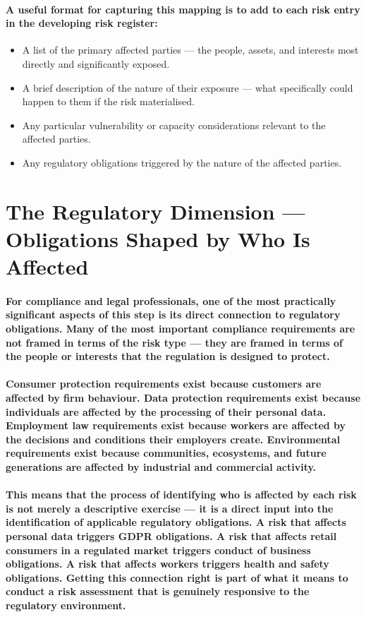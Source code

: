 \paragraph{A useful format for capturing this mapping is to add to each risk entry in the developing risk register:}
\begin{itemize}
    \item{A list of the primary affected parties — the people, assets, and interests most directly and significantly exposed.}
    \item{A brief description of the nature of their exposure — what specifically could happen to them if the risk materialised.}
    \item{Any particular vulnerability or capacity considerations relevant to the affected parties.}
    \item{Any regulatory obligations triggered by the nature of the affected parties.}
\end{itemize}

\section{The Regulatory Dimension — Obligations Shaped by Who Is Affected}
\paragraph{For compliance and legal professionals, one of the most practically significant aspects of this step is its direct connection to regulatory obligations. Many of the most important compliance requirements are not framed in terms of the risk type — they are framed in terms of the people or interests that the regulation is designed to protect.}
\paragraph{Consumer protection requirements exist because customers are affected by firm behaviour. Data protection requirements exist because individuals are affected by the processing of their personal data. Employment law requirements exist because workers are affected by the decisions and conditions their employers create. Environmental requirements exist because communities, ecosystems, and future generations are affected by industrial and commercial activity.}
\paragraph{This means that the process of identifying who is affected by each risk is not merely a descriptive exercise — it is a direct input into the identification of applicable regulatory obligations. A risk that affects personal data triggers GDPR obligations. A risk that affects retail consumers in a regulated market triggers conduct of business obligations. A risk that affects workers triggers health and safety obligations. Getting this connection right is part of what it means to conduct a risk assessment that is genuinely responsive to the regulatory environment.}


